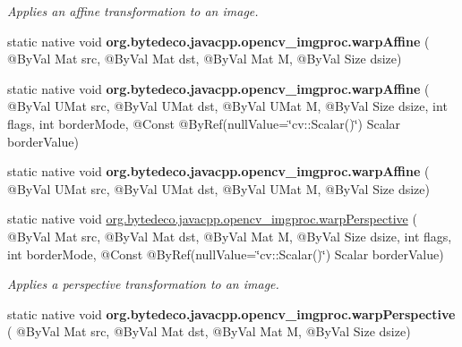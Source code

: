 \begin{DoxyCompactItemize}
\begin{DoxyCompactList}\small\item\em Applies an affine transformation to an image. \end{DoxyCompactList}\item 
\mbox{\label{group__imgproc__transform_ga7dd11efdfcdaaee49b3a69cdf099f9ac}} 
static native void {\bfseries org.\+bytedeco.\+javacpp.\+opencv\+\_\+imgproc.\+warp\+Affine} ( @By\+Val Mat src, @By\+Val Mat dst, @By\+Val Mat M, @By\+Val Size dsize)
\item 
\mbox{\label{group__imgproc__transform_gac8f616b00342b8ef18d3d7e184499f98}} 
static native void {\bfseries org.\+bytedeco.\+javacpp.\+opencv\+\_\+imgproc.\+warp\+Affine} ( @By\+Val U\+Mat src, @By\+Val U\+Mat dst, @By\+Val U\+Mat M, @By\+Val Size dsize, int flags, int border\+Mode, @Const @By\+Ref(null\+Value=\char`\"{}cv\+::\+Scalar()\char`\"{}) Scalar border\+Value)
\item 
\mbox{\label{group__imgproc__transform_ga947de0abed0cf920fd4ff696b89e66ed}} 
static native void {\bfseries org.\+bytedeco.\+javacpp.\+opencv\+\_\+imgproc.\+warp\+Affine} ( @By\+Val U\+Mat src, @By\+Val U\+Mat dst, @By\+Val U\+Mat M, @By\+Val Size dsize)
\item 
static native void \hyperlink{group__imgproc__transform_ga75e1d893d7bf652cd99d608259c00c24}{org.\+bytedeco.\+javacpp.\+opencv\+\_\+imgproc.\+warp\+Perspective} ( @By\+Val Mat src, @By\+Val Mat dst, @By\+Val Mat M, @By\+Val Size dsize, int flags, int border\+Mode, @Const @By\+Ref(null\+Value=\char`\"{}cv\+::\+Scalar()\char`\"{}) Scalar border\+Value)
\begin{DoxyCompactList}\small\item\em Applies a perspective transformation to an image. \end{DoxyCompactList}\item 
\mbox{\label{group__imgproc__transform_gaac20223cd81fd0b404970922c5a20da8}} 
static native void {\bfseries org.\+bytedeco.\+javacpp.\+opencv\+\_\+imgproc.\+warp\+Perspective} ( @By\+Val Mat src, @By\+Val Mat dst, @By\+Val Mat M, @By\+Val Size dsize)
\item 
\mbox{\label{group__imgproc__transform_ga7e99b9efc66c95a5252b47d24e5d0997}} 

\end{DoxyCompactItemize}

